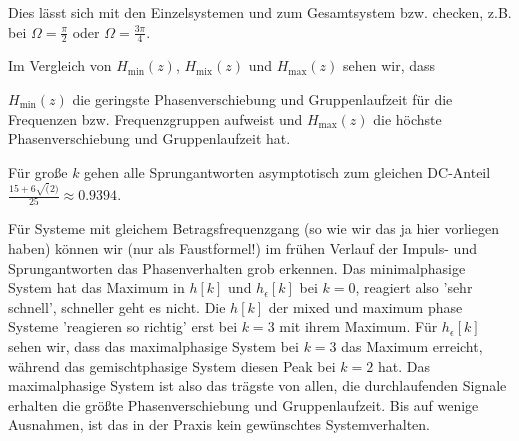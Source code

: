 \begin{Loesung}
Dies lässt sich mit den Einzelsystemen  und
 zum Gesamtsystem 
bzw.  checken, z.B. bei $\Omega=\frac{\pi}{2}$ oder
$\Omega=\frac{3\pi}{4}$.

Im Vergleich von $H_\mathrm{min}(z)$, $H_\mathrm{mix}(z)$ und $H_\mathrm{max}(z)$
sehen wir, dass

$H_\mathrm{min}(z)$ die geringste Phasenverschiebung und Gruppenlaufzeit
für die Frequenzen bzw. Frequenzgruppen aufweist und $H_\mathrm{max}(z)$
die höchste Phasenverschiebung und Gruppenlaufzeit hat.

Für große $k$ gehen alle Sprungantworten asymptotisch zum gleichen DC-Anteil
$\frac{15+6\sqrt(2)}{25} \approx 0.9394$.

Für Systeme mit gleichem Betragsfrequenzgang (so wie wir das ja hier vorliegen
haben) können wir (nur als Faustformel!) im frühen Verlauf der Impuls- und
Sprungantworten das Phasenverhalten grob erkennen.
Das minimalphasige System hat das Maximum in $h[k]$ und $h_\epsilon[k]$ bei $k=0$,
reagiert also 'sehr schnell', schneller geht es nicht. Die $h[k]$ der mixed und
maximum phase Systeme 'reagieren so richtig' erst bei $k=3$ mit ihrem Maximum.
%
Für $h_\epsilon[k]$ sehen wir, dass das maximalphasige System bei $k=3$ das
Maximum erreicht, während das gemischtphasige System diesen Peak bei $k=2$
hat.
%
Das maximalphasige System ist also das trägste von allen, die durchlaufenden
Signale erhalten die größte Phasenverschiebung und Gruppenlaufzeit. Bis auf
wenige Ausnahmen, ist das in der Praxis kein gewünschtes Systemverhalten.

\end{Loesung}



